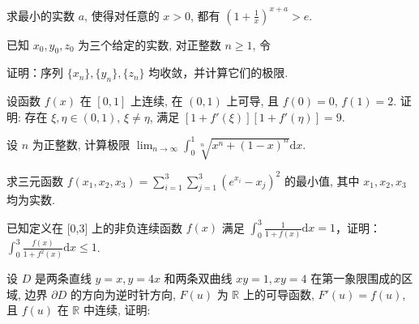 求最小的实数 $a$, 使得对任意的 $x > 0$, 都有 $\left(1 + \frac{1}{x}\right)^{x + a} > e$.\par
\par{}
已知 $x_0, y_0, z_0$ 为三个给定的实数, 对正整数 $n \geq 1$, 令\par
\nopagebreak[4]
证明：序列 $\{x_{n}\} ,\{y_{n}\} ,\{z_{n}\}$ 均收敛，并计算它们的极限.\par
设函数 $f(x)$ 在 $[0,1]$ 上连续, 在 $(0,1)$ 上可导, 且 $f(0) = 0$, $f(1) = 2$. 证明: 存在 $\xi, \eta \in (0,1)$, $\xi \neq \eta$, 满足 $[1 + f'(\xi)][1 + f'(\eta)] = 9$.\par
设 $n$ 为正整数, 计算极限 $\lim_{n\to \infty}\int_0^1\sqrt[n]{x^n + (1 - x)^n}\mathrm{d}x.$\par
求三元函数 $f(x_{1}, x_{2}, x_{3}) = \sum_{i=1}^{3} \sum_{j=1}^{3} (e^{x_{i}} - x_{j})^{2}$ 的最小值, 其中 $x_{1}, x_{2}, x_{3}$ 均为实数.\par
已知定义在 [0,3] 上的非负连续函数 $f(x)$ 满足 $\int_{0}^{3}\frac{1}{1 + f(x)}\mathrm{d}x = 1$，证明：$\int_{0}^{3}\frac{f(x)}{1 + f^2(x)}\mathrm{d}x \leq 1$.\par
\par{}
设 $D$ 是两条直线 $y = x, y = 4x$ 和两条双曲线 $xy = 1, xy = 4$ 在第一象限围成的区域, 边界 $\partial D$ 的方向为逆时针方向, $F(u)$ 为 $\mathbb{R}$ 上的可导函数, $F'(u) = f(u)$, 且 $f(u)$ 在 $\mathbb{R}$ 中连续, 证明:\par
\nopagebreak[4]
